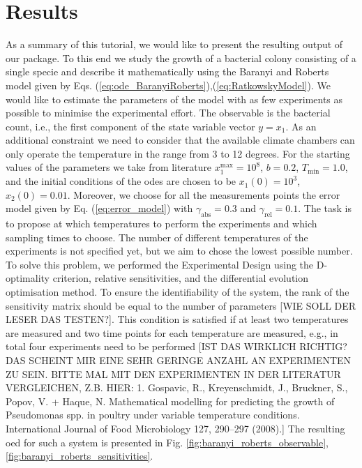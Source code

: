 \documentclass[10pt,A4paper]{article}
\begin{document}
\section*{Results}
As a summary of this tutorial, we would like to present the resulting output of our package. 
To this end we study the growth of a bacterial colony consisting of a single specie and describe it mathematically using the Baranyi and Roberts model given by Eqs. (\ref{eq:ode_BaranyiRoberts}),(\ref{eq:RatkowskyModel}). 
We would like to estimate the parameters of the model with as few experiments as possible to minimise the experimental effort. 
The observable is the bacterial count, i.e., the first component of the state variable vector $y = x_1$.
As an additional constraint we need to consider that the available climate chambers can only operate the temperature in the range from 3 to 12 degrees. 
For the starting values of the parameters we take from literature $x_1^\text{max}=10^8$, $b=0.2$, $T_\text{min}=1.0$, and the initial conditions of the \acp{ode} are chosen to be $x_1(0) = 10^3$, $x_2(0)=0.01$. 
Moreover, we choose for all the measurements points the error model given by Eq. (\ref{eq:error_model}) with $\gamma_\text{abs}=0.3$ and $\gamma_\text{rel}=0.1$. The task is to propose at which temperatures to perform the experiments and which sampling times to choose. 
The number of different temperatures of the experiments is not specified yet, but we aim to chose the lowest possible number. To solve this problem, we performed the Experimental Design using the D-optimality criterion, relative sensitivities, and the differential evolution optimisation method. 
To ensure the identifiability of the system, the rank of the sensitivity matrix should be equal to the number of parameters [WIE SOLL DER LESER DAS TESTEN?]. 
This condition is satisfied if at least two temperatures are measured and two time points for each temperature are measured, e.g., in total four experiments need to be performed [IST DAS WIRKLICH RICHTIG? DAS SCHEINT MIR EINE SEHR GERINGE ANZAHL AN EXPERIMENTEN ZU SEIN. BITTE MAL MIT DEN EXPERIMENTEN IN DER LITERATUR VERGLEICHEN, Z.B. HIER: 1. Gospavic, R., Kreyenschmidt, J., Bruckner, S., Popov, V. + Haque, N. Mathematical modelling for predicting the growth of Pseudomonas spp. in poultry under variable temperature conditions. International Journal of Food Microbiology 127, 290–297 (2008).] 
The resulting \ac{oed} for such a system is presented in Fig. \ref{fig:baranyi_roberts_observable}, \ref{fig:baranyi_roberts_sensitivities}.
\end{document}
